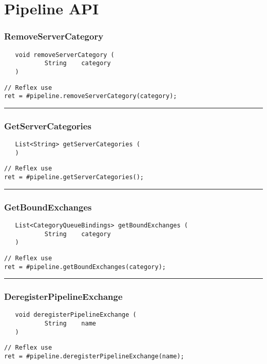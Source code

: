 \section{Pipeline API}

\subsubsection{RemoveServerCategory}
\label{Api:RemoveServerCategory}
\begin{verbatim}
   void removeServerCategory (
           String    category
   )
\end{verbatim}
\begin{lstlisting}[language=reflex]
// Reflex use
ret = #pipeline.removeServerCategory(category);
\end{lstlisting}



\rule{15cm}{2pt}
\subsubsection{GetServerCategories}
\label{Api:GetServerCategories}
\begin{verbatim}
   List<String> getServerCategories (
   )
\end{verbatim}
\begin{lstlisting}[language=reflex]
// Reflex use
ret = #pipeline.getServerCategories();
\end{lstlisting}



\rule{15cm}{2pt}
\subsubsection{GetBoundExchanges}
\label{Api:GetBoundExchanges}
\begin{verbatim}
   List<CategoryQueueBindings> getBoundExchanges (
           String    category
   )
\end{verbatim}
\begin{lstlisting}[language=reflex]
// Reflex use
ret = #pipeline.getBoundExchanges(category);
\end{lstlisting}



\rule{15cm}{2pt}
\subsubsection{DeregisterPipelineExchange}
\label{Api:DeregisterPipelineExchange}
\begin{verbatim}
   void deregisterPipelineExchange (
           String    name
   )
\end{verbatim}
\begin{lstlisting}[language=reflex]
// Reflex use
ret = #pipeline.deregisterPipelineExchange(name);
\end{lstlisting}



